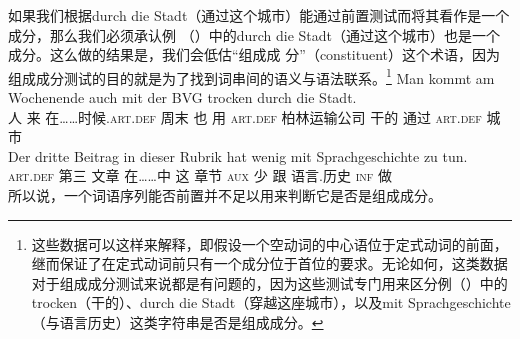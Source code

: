 如果我们根据durch die Stadt（通过这个城市）能通过前置测试而将其看作是一个成分，那么我们必须承认例
（）中的durch die Stadt（通过这个城市）也是一个成分。这么做的结果是，我们会低估“组成成
分”（constituent）这个术语，因为组成成分测试的目的就是为了找到词串间的语义与语法联系。\footnote{%
这些数据可以这样来解释，即假设一个空动词的中心语位于定式动词的前面，继而保证了在定式动词前只有一个成分位于首位的要求。\citep{Mueller2005d,MuellerGS}无论如何，这类数据对于组成成分测试来说都是有问题的，因为这些测试专门用来区分例（）中的trocken（干的）、durch die Stadt（穿越这座城市），以及mit Sprachgeschichte（与语言历史）这类字符串是否是组成成分。}
\eal
\ex 
\gll Man kommt am Wochenende auch mit der BVG trocken durch die Stadt.\\
     人 来 在……时候.\textsc{art}.\textsc{def} 周末 也 用 \textsc{art}.\textsc{def} 柏林运输公司 干的 通过 \textsc{art}.\textsc{def} 城市\\
\ex 
\gll Der dritte Beitrag in dieser Rubrik hat wenig mit Sprachgeschichte zu tun.\\
     \textsc{art}.\textsc{def} 第三  文章 在……中 这 章节  \textsc{aux} 少 跟 语言.历史 \textsc{inf} 做\\
\zl
所以说，一个词语序列能否前置并不足以用来判断它是否是组成成分。

